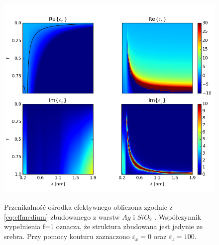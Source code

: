 \begin{figure}[tb]
	\includegraphics[width=\textwidth]{images/multilayer/agsio2-effective.png}
	\label{fig:multiex}
	\caption{Przenikalność ośrodka efektywnego obliczona zgodnie z \ref{eq:effmedium}  zbudowanego z warstw $Ag$ \cite{PhysRevB.6.4370} i $SiO_2$ \cite{MALITSON:65}. Współczynnik wypełnienia f=1 oznacza, że struktura zbudowana jest jedynie ze srebra. Przy pomocy konturu zaznaczono $\varepsilon_x=0$ oraz $\varepsilon_z=100$.}
\end{figure}

